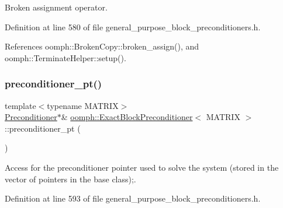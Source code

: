 Broken assignment operator. 



Definition at line 580 of file general\+\_\+purpose\+\_\+block\+\_\+preconditioners.\+h.



References oomph\+::\+Broken\+Copy\+::broken\+\_\+assign(), and oomph\+::\+Terminate\+Helper\+::setup().

\mbox{\label{classoomph_1_1ExactBlockPreconditioner_acc758ad816f9037f3490cec8d3f3fe9b}} 
\subsubsection{\texorpdfstring{preconditioner\+\_\+pt()}{preconditioner\_pt()}}
{\footnotesize\ttfamily template$<$typename M\+A\+T\+R\+IX$>$ \\
\hyperlink{classoomph_1_1Preconditioner}{Preconditioner}$\ast$\& \hyperlink{classoomph_1_1ExactBlockPreconditioner}{oomph\+::\+Exact\+Block\+Preconditioner}$<$ M\+A\+T\+R\+IX $>$\+::preconditioner\+\_\+pt (\begin{DoxyParamCaption}{ }\end{DoxyParamCaption})\hspace{0.3cm}{\ttfamily [inline]}}



Access for the preconditioner pointer used to solve the system (stored in the vector of pointers in the base class);. 



Definition at line 593 of file general\+\_\+purpose\+\_\+block\+\_\+preconditioners.\+h.

\mbox{\label{classoomph_1_1ExactBlockPreconditioner_a4267f2937d09e9949b355a19ad107044}} 
